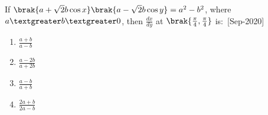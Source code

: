     \item If $\brak{a+\sqrt{2}b\cos{x}}\brak{a-\sqrt{2}b\cos{y}}=a^2-b^2$, where $a\textgreater b \textgreater 0$, then $\frac{dx}{dy}$ at $\brak{\frac{\pi}{4},\frac{\pi}{4}}$ is$\colon$
    \hfill{[Sep-2020]}
        \begin{enumerate}
            \item $\frac{a+b}{a-b}$
            \item $\frac{a-2b}{a+2b}$
            \item $\frac{a-b}{a+b}$
            \item $\frac{2a+b}{2a-b}$
        \end{enumerate}
